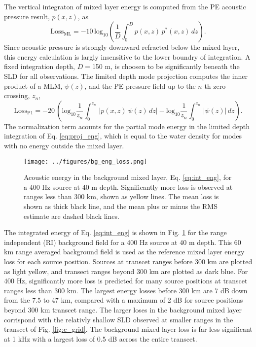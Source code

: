 \documentclass[preprint,NumberedRefs]{JASA}
\begin{document}
The vertical integraton of mixed layer energy is computed from the PE acoustic pressure result, $p(x, z)$, as
\begin{equation}
    \textrm{Loss}_{\textrm{ML}} = -10 \, \textrm{log}_{10} \left( \frac{1}{D} \int^{D}_0 p(x, z) \, p^* (x, z) \,  dz \right).
    \label{eq:int_eng}
\end{equation}
Since acoustic pressure is strongly downward refracted below the mixed layer, this energy calculation is largly insensitive to the lower boundry of integration. A fixed integration depth, $D=$150 m, is choosen to be significantly beneath the SLD for all observations. The limited depth mode projection computes the inner product of a MLM, $\psi(z)$, and the PE pressure field up to the $n$-th zero crossing, $z_n$,
\begin{equation}
    \textrm{Loss}_{\textrm{P1}} = -20 \, \left( \textrm{log}_{10} \frac{1}{z_n} \int^{z_n}_0 \, \left| p(x, z) \ \psi(z) \,  dz \right| - \textrm{log}_{10} \frac{1}{z_n} \int^{z_n}_0 \, \left| \psi(z) \right| \,  dz \right).
    \label{eq:proj_eng}
\end{equation}
The normalization term acounts for the partial mode energy in the limited depth integration of Eq. \eqref{eq:proj_eng}, which is equal to the water density for modes with no energy outside the mixed layer\citep{jensen2011computational}.

\begin{figure}
\texttt{[image: ../figures/bg\_eng\_loss.png]}
    \caption{Acoustic energy in the background mixed layer, Eq. \eqref{eq:int_eng}, for a 400 Hz source at 40 m depth. Significantly more loss is observed at ranges less than 300 km, shown as yellow lines. The mean loss is shown as thick black line, and the mean plus or minus the RMS estimate are dashed black lines.}
    \label{fig:bg_eng}
\end{figure}
The integrated energy of Eq. \eqref{eq:int_eng} is shown in Fig. \ref{fig:bg_eng} for the range independent (RI) background field for a 400 Hz source at 40 m depth. This 60 km range averaged background field is used as the reference mixed layer energy loss for each source position. Sources at transcet ranges before 300 km are plotted as light yellow, and transect ranges beyond 300 km are plotted as dark blue. For 400 Hz, significantly more loss is predicted for many source positions at transcet ranges less than 300 km. The largest energy losses before 300 km are 7 dB down from the 7.5 to 47 km, compared with a maximum of 2 dB for source positions beyond 300 km transcet range. The larger loses in the background mixed layer corrispond with the relativly shallow SLD observed at smaller ranges in the transcet of Fig. \ref{fig:c_grid}. The background mixed layer loss is far less significant at 1 kHz with a largest loss of 0.5 dB across the entire transcet.
\end{document}
